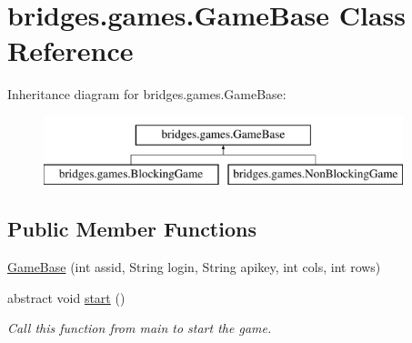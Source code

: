 \hypertarget{classbridges_1_1games_1_1_game_base}{}\section{bridges.\+games.\+Game\+Base Class Reference}
\label{classbridges_1_1games_1_1_game_base}
Inheritance diagram for bridges.\+games.\+Game\+Base\+:\begin{figure}[H]
\begin{center}
\leavevmode
\includegraphics[height=2.000000cm]{classbridges_1_1games_1_1_game_base}
\end{center}
\end{figure}
\subsection*{Public Member Functions}
\begin{DoxyCompactItemize}
\item 
\mbox{\hyperlink{classbridges_1_1games_1_1_game_base_a9ff11dcae7d4774a6341ff026212f96d}{Game\+Base}} (int assid, String login, String apikey, int cols, int rows)
\item 
abstract void \mbox{\hyperlink{classbridges_1_1games_1_1_game_base_a4b09bc799726e4a59b1ab039b941b188}{start}} ()
\begin{DoxyCompactList}\small\item\em Call this function from main to start the game. \end{DoxyCompactList}\end{DoxyCompactItemize}
